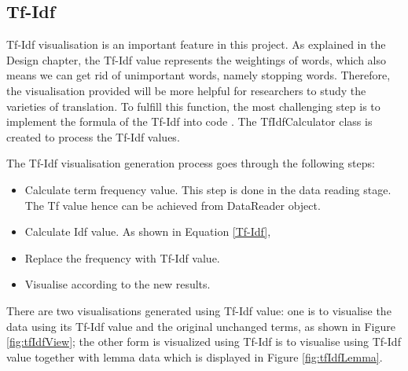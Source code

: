 \subsection{Tf-Idf}

Tf-Idf visualisation is an important feature in this project. As explained in the Design chapter, the Tf-Idf value represents the weightings of words, which also means we can get rid of unimportant words, namely stopping words. Therefore, the visualisation provided will be more helpful for researchers to study the varieties of translation. To fulfill this function, the most challenging step is to implement the formula of the Tf-Idf into code \cite{Manning2009}. The TfIdfCalculator class is created to process the Tf-Idf values.

The Tf-Idf visualisation generation process goes through the following steps:

\begin{itemize}
\item \textbf{} Calculate term frequency value. This step is done in the data reading stage. The Tf value hence can be achieved from DataReader object.
\item \textbf{} Calculate Idf value. As shown in Equation \ref{Tf-Idf},
\item \textbf{} Replace the frequency with Tf-Idf value.
\item \textbf{} Visualise according to the new results.
\end{itemize} 

There are two visualisations generated using Tf-Idf value: one is to visualise the data using its Tf-Idf value and the original unchanged terms, as shown in Figure \ref{fig:tfIdfView}; the other form is visualized using Tf-Idf is to visualise using Tf-Idf value together with lemma data which is displayed in Figure \ref{fig:tfIdfLemma}.

